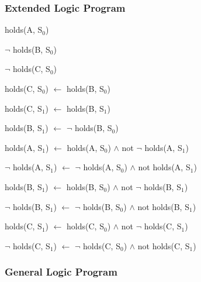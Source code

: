 \documentclass[a4paper,draft]{article}
\begin{document}
      \subsubsection{Extended Logic Program}

        \begin{list}{}{Initial State}
          \item holds(A, S$_{0}$)
          \item $\lnot$ holds(B, S$_{0}$)
          \item $\lnot$ holds(C, S$_{0}$)
        \end{list}

        \begin{list}{}{Constraint}
          \item holds(C, S$_{0}$) $\leftarrow$ holds(B, S$_{0}$)
          \item holds(C, S$_{1}$) $\leftarrow$ holds(B, S$_{1}$)
        \end{list}

        \begin{list}{}{Transformation}
          \item holds(B, S$_{1}$) $\leftarrow$ $\lnot$ holds(B, S$_{0}$)
        \end{list}

        \begin{list}{}{Inertial Rules}
          \item
            holds(A, S$_{1}$) $\leftarrow$ holds(A, S$_{0}$) $\land$ not
            $\lnot$ holds(A, S$_{1}$)
          \item
            $\lnot$ holds(A, S$_{1}$) $\leftarrow$ $\lnot$ holds(A, S$_{0}$) 
            $\land$ not holds(A, S$_{1}$)
          \item
            holds(B, S$_{1}$) $\leftarrow$ holds(B, S$_{0}$) $\land$ not
            $\lnot$ holds(B, S$_{1}$)
          \item
            $\lnot$ holds(B, S$_{1}$) $\leftarrow$ $\lnot$ holds(B, S$_{0}$) 
            $\land$ not holds(B, S$_{1}$)
          \item
            holds(C, S$_{1}$) $\leftarrow$ holds(C, S$_{0}$) $\land$ not
            $\lnot$ holds(C, S$_{1}$)
          \item
            $\lnot$ holds(C, S$_{1}$) $\leftarrow$ $\lnot$ holds(C, S$_{0}$)
            $\land$ not holds(C, S$_{1}$)
        \end{list}

      \subsubsection{General Logic Program}
\end{document}
